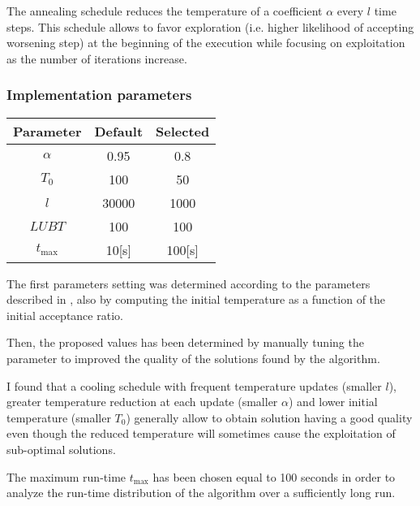 \begin{homeworkProblem}
The annealing schedule reduces the temperature of a coefficient $\alpha$ every $l$ time steps. 
This schedule allows to favor exploration (i.e. higher likelihood of accepting worsening step) at the beginning of the execution while focusing on exploitation as the number of iterations increase.

\subsubsection{Implementation parameters}
\begin{center}
\begin{tabular}{|c|c|c|}
\hline
\textbf{Parameter} & \textbf{Default} & \textbf{Selected} \\ \hline 
$\alpha$ & 0.95 & 0.8 \\\hline 
$T_0$ & 100 & 50 \\ \hline 
$l$ & 30000 & 1000 \\ \hline 
$LUBT$ & 100 & 100 \\ \hline 
$t_{\max}$ & 10[s] & 100[s] \\
\hline
\end{tabular}
\label{saParameters}
\end{center}

The first parameters setting was determined according to the parameters described in \cite{ohlmann2007compressed}, also by computing the initial temperature as a function of the initial acceptance ratio.

Then, the proposed values has been determined by manually tuning the parameter to improved the quality of the solutions found by the algorithm.

I found that a cooling schedule with frequent temperature updates (smaller $l$), greater temperature reduction at each update (smaller $\alpha$) and lower initial temperature (smaller $T_0$) generally allow to obtain solution having a good quality even though the reduced temperature will sometimes cause the exploitation of sub-optimal solutions.

The maximum run-time $t_{\max}$ has been chosen equal to 100 seconds in order to analyze the run-time distribution of the algorithm over a sufficiently long run.
 
\end{homeworkProblem}		
